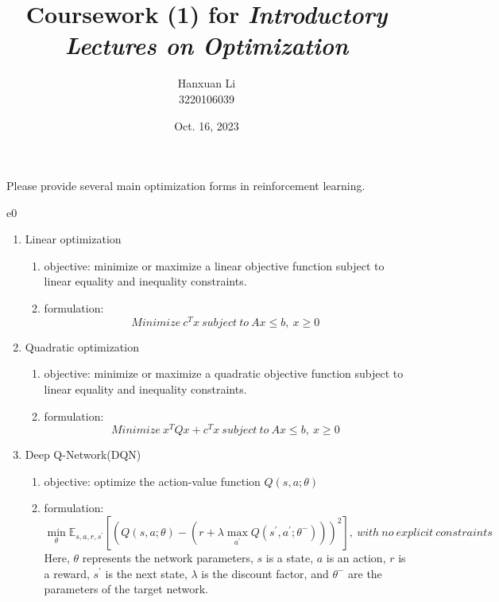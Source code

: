 \documentclass{article}
\title{Coursework (1) for \emph{Introductory Lectures on Optimization}}
\author{Hanxuan Li \\ 3220106039}
\date{Oct. 16, 2023}
\begin{document}
\maketitle

\begin{excercise}\label{e0}
Please provide several main optimization forms in reinforcement learning.
\end{excercise}
\begin{SOLUTION}{e0}
	\begin{enumerate}
		\item Linear optimization
			\begin{enumerate}
				\item objective: minimize or maximize a linear objective function subject to linear equality and inequality constraints.
				\item formulation: 
				\begin{equation}
					Minimize\ c^Tx\ subject\ to\ Ax \le b,\ x\ge 0
				\end{equation}
			\end{enumerate}
		\item Quadratic optimization
		\begin{enumerate}
			\item objective: minimize or maximize a quadratic objective function subject to linear equality and inequality constraints.
			\item formulation:
			\begin{equation}
				Minimize\ x^TQx+c^Tx\ subject\ to\ Ax\le b,\ x\ge 0
			\end{equation}
		\end{enumerate}
		\item Deep Q-Network(DQN)
		\begin{enumerate}
			\item objective: optimize the action-value function $Q(s,a;\theta)$
			\item formulation:
			\begin{equation}
				\mathop{min}_{\theta}\mathbb{E}_{s,a,r,s^{'}}[(Q(s,a;\theta)-(r+\lambda\mathop{max}_{a^{'}}Q(s^{'},a^{'};\theta^{-})))^2],\ with\ no\ explicit\ constraints
			\end{equation}
			Here, $\theta$ represents the network parameters, $s$ is a state, $a$ is an action, $r$ is a reward, $s^{'}$ is the next state, $\lambda$ is the discount factor, and $\theta^{-}$ are the parameters of the target network. 
		\end{enumerate}
	\end{enumerate}
\end{SOLUTION}
\end{document}
